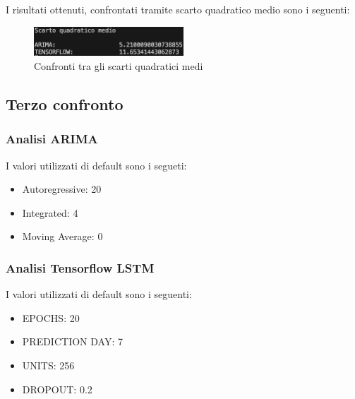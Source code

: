 \documentclass[a4paper,12pt]{article}
\begin{document}
            I risultati ottenuti, confrontati tramite scarto quadratico medio
            sono i seguenti:
            \begin{figure}[H]
                \centering
                \includegraphics[width=0.5\textwidth]{SQM2.png}
                \caption{Confronti tra gli scarti quadratici medi}
            \end{figure}

        \newpage

        \subsection{Terzo confronto}
            \subsubsection{Analisi ARIMA} I valori utilizzati di default sono i
            segueti:
            \begin{itemize}
                \item Autoregressive: 20
                \item Integrated: 4
                \item Moving Average: 0 
            \end{itemize}
            \subsubsection{Analisi Tensorflow LSTM} I valori utilizzati di 
            default sono i seguenti:
            \begin{itemize}
                \item EPOCHS: 20
                \item PREDICTION DAY: 7
                \item UNITS: 256
                \item DROPOUT: 0.2
            \end{itemize}
\end{document}
